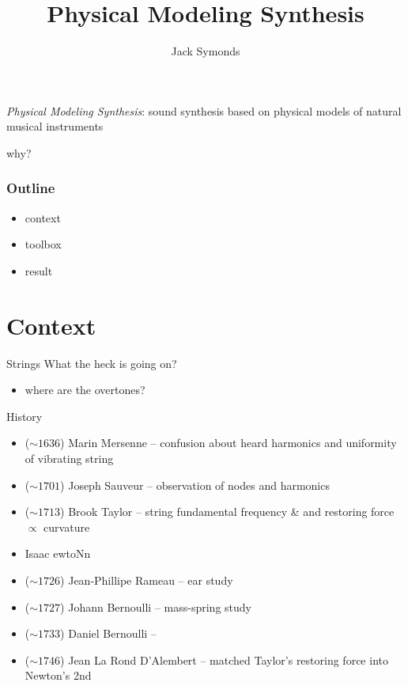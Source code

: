 \documentclass{beamer}
\title{Physical Modeling Synthesis}
\author{Jack Symonds}
\date{}
\begin{document}
\frame{\titlepage}

\begin{frame}
\emph{Physical Modeling Synthesis}: sound synthesis based on physical models of natural musical instruments
\end{frame}

\begin{frame}
\centering why?
\end{frame}

\begin{frame}
\frametitle{Outline}
\begin{itemize}
\item<1-> context
\item<2-> toolbox
\item<3-> result
\end{itemize}
\end{frame}

\section{Context}
\begin{frame}{Strings}
What the heck is going on?
\begin{itemize}
\item<1-> where are the overtones?
\end{itemize}
\end{frame}

\begin{frame}{History}
\begin{itemize}
\item ($\sim 1636$) Marin Mersenne -- confusion about heard harmonics and uniformity of vibrating string
\item ($\sim 1701$) Joseph Sauveur -- observation of nodes and harmonics
\item ($\sim 1713$) Brook Taylor -- string fundamental frequency \& and restoring force $\propto$ curvature 
\item Isaac  ewtoNn
\item ($\sim 1726$) Jean-Phillipe Rameau -- ear study
\item ($\sim 1727$) Johann Bernoulli -- mass-spring study
\item ($\sim 1733$) Daniel Bernoulli -- 
\item ($\sim1746$) Jean La Rond D'Alembert -- matched Taylor's restoring force into Newton's 2nd
\end{itemize}
\end{frame}
\end{document}
